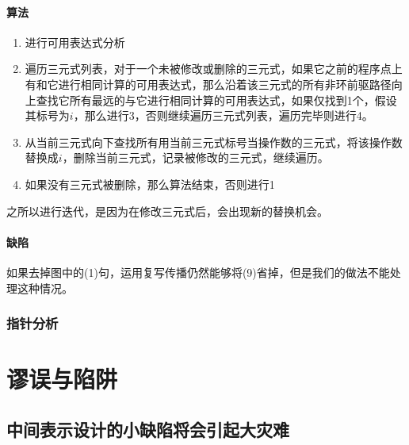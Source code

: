 \paragraph*{算法}
\begin{enumerate}
	\item 进行可用表达式分析
	\item 遍历三元式列表，对于一个未被修改或删除的三元式，如果它之前的程序点上有和它进行相同计算的可用表达式，那么沿着该三元式的所有非环前驱路径向上查找它所有最远的与它进行相同计算的可用表达式，如果仅找到1个，假设其标号为$i$，那么进行3，否则继续遍历三元式列表，遍历完毕则进行4。
	\item 从当前三元式向下查找所有用当前三元式标号当操作数的三元式，将该操作数替换成$i$，删除当前三元式，记录被修改的三元式，继续遍历。
	\item 如果没有三元式被删除，那么算法结束，否则进行1
\end{enumerate}
之所以进行迭代，是因为在修改三元式后，会出现新的替换机会。
\paragraph*{缺陷}
	如果去掉图中的(1)句，运用复写传播仍然能够将(9)省掉，但是我们的做法不能处理这种情况。
\subsubsection{指针分析}

\section{谬误与陷阱}
\label{pitfallc2}
\subsection*{中间表示设计的小缺陷将会引起大灾难}
